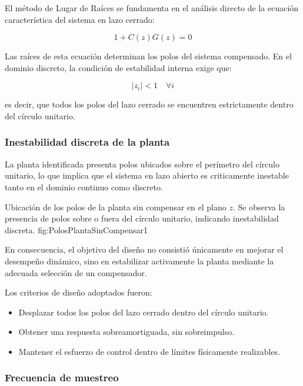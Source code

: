 El método de Lugar de Raíces se fundamenta en el análisis directo de la ecuación característica del sistema en lazo cerrado:

\[
1 + C(z)G(z) = 0
\]

Las raíces de esta ecuación determinan los polos del sistema compensado.  
En el dominio discreto, la condición de estabilidad interna exige que:

\[
|z_i| < 1 \quad \forall i
\]

es decir, que todos los polos del lazo cerrado se encuentren estrictamente dentro del círculo unitario.

\subsubsection{Inestabilidad discreta de la planta}

La planta identificada presenta polos ubicados sobre el perímetro del círculo unitario, lo que implica que el sistema en lazo abierto es criticamente inestable tanto  en el dominio continuo como discreto.

{Ubicación de los polos de la planta sin compensar en el plano $z$. Se observa la presencia de polos sobre o fuera del círculo unitario, indicando inestabilidad discreta.}
{fig:PolosPlantaSinCompensar}{1}

En consecuencia, el objetivo del diseño no consistió únicamente en mejorar el desempeño dinámico, sino en estabilizar activamente la planta mediante la adecuada selección de un compensador.

Los criterios de diseño adoptados fueron:

\begin{itemize}
	\item Desplazar todos los polos del lazo cerrado dentro del círculo unitario.
	\item Obtener una respuesta sobreamortiguada, sin sobreimpulso.
	\item Mantener el esfuerzo de control dentro de límites físicamente realizables.
\end{itemize}

\subsubsection{Frecuencia de muestreo}

